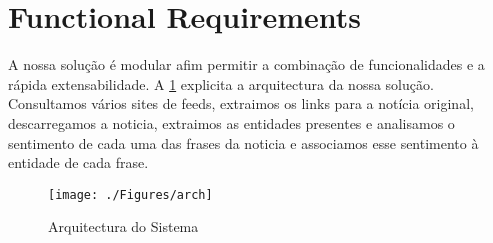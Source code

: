 \section{Functional Requirements}
A nossa solução é  modular afim permitir a combinação de funcionalidades e a rápida extensabilidade. A \ref{fig:arch} explicita a arquitectura da nossa solução. Consultamos vários sites de feeds, extraimos os links para a notícia original, descarregamos a noticia, extraimos as entidades presentes e analisamos o sentimento de cada uma das frases da noticia e associamos esse sentimento à entidade de cada frase.
\begin{figure}[h!]
\centering
\texttt{[image: ./Figures/arch]}
\caption{Arquitectura do Sistema}
\label{fig:arch}
\end{figure}
